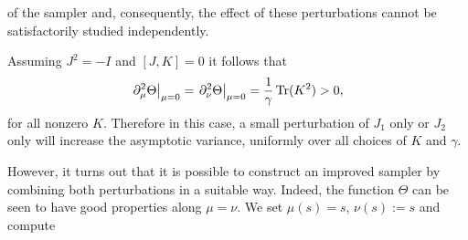 of the sampler and, consequently, the effect of these perturbations cannot be satisfactorily
studied independently. 
\begin{example}
	Assuming $J^{2}=-I$ and $[J,K]=0$ it follows that
	\[
	\left. \partial_{\mu}^{2}\Theta\right\rvert_{\mu=0}=\left. \partial_{\nu}^{2}\Theta\right\rvert_{\mu=0}=\frac{1}{\gamma}\operatorname{Tr}(K^{2})>0,
	\]
	for all nonzero $K$. Therefore in this case, a small perturbation of $J_{1}$ only or $J_{2}$ only will increase  the asymptotic variance, uniformly over all choices of $K$ and $\gamma$.
\end{example}
However, it turns out that it is possible to construct an improved sampler
by combining both perturbations in a suitable way. Indeed,
the function $\Theta$ can be seen to have good properties along $\mu=\nu$. We set $\mu(s)=s$, $\nu(s):=s$ and compute

